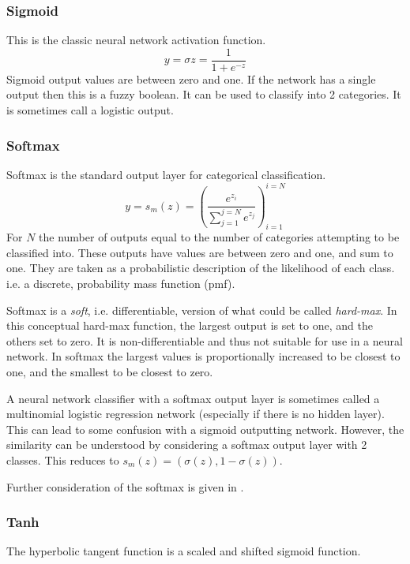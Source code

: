 \documentclass[12pt,parskip]{komatufte}
\begin{document}
\subsubsection{Sigmoid}
This is the classic neural network activation function.
\begin{equation}
y=\sigma{z}=\frac{1}{1+e^{-z}}
\end{equation}
Sigmoid output values are between zero and one.
If the network has a single output then this is a fuzzy boolean.
It can be used to classify into 2 categories.
It is sometimes call a logistic output.

\subsubsection{Softmax}
Softmax is the standard output layer for categorical classification.
\begin{equation}
y=s_m(z)=\left( \frac{e^{z_i}}{\sum_{j=1}^{j=N} e^{z_j}} \right)_{i=1}^{i=N}
\end{equation}
For $N$ the number of outputs equal to the number of categories attempting to be classified into.
These outputs have  values are between zero and one, and sum to one.
They are taken as a probabilistic description of the likelihood of each class.
i.e. a discrete, probability mass function (pmf).


Softmax is a \emph{soft}, i.e. differentiable,  version of what could be called \emph{hard-max}.
In this conceptual hard-max function, the largest output is set to one, and the others set to zero.
It is non-differentiable and thus not suitable for use in a neural network.
In softmax the largest values is proportionally increased to be closest to one,
and the smallest to be closest to zero.

A neural network classifier with a softmax output layer is sometimes called a multinomial logistic regression network (especially if there is no hidden layer).
This can lead to some confusion with a sigmoid outputting network.
However, the similarity can be understood by considering a softmax output layer with 2 classes.
This reduces to $s_m(z)= \left( \sigma(z), 1-\sigma(z) \right)$.

Further consideration of the softmax is given in .

\subsubsection{Tanh}
The hyperbolic tangent function is a  scaled and shifted sigmoid function.
\end{document}
